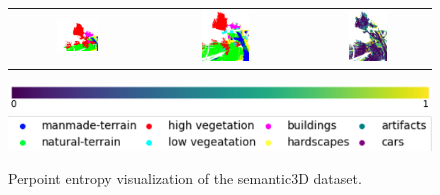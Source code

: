 \begin{figure}[h!]
\begin{tabular}{ccc}
            \includegraphics[width=0.33\textwidth, height=0.18\textheight]{images/seg_output/sem3d_seg_output/3_GT.pdf} &
            \includegraphics[width=0.33\textwidth, height=0.18\textheight]{images/seg_output/flipout/sem3d_3.pdf}& 
            \includegraphics[width=0.33\textwidth, height=0.18\textheight]{images/seg_output/sem3d_seg_output/ent_fout_3.pdf}\\
        \end{tabular}
        \includegraphics[scale=0.45]{images/prob_legend.pdf}
        \includegraphics[scale=0.65]{images/legend.png}
        \caption{Perpoint entropy visualization of the semantic3D dataset.}
        \label{fig:fout_sem3d_entmap}
    \end{figure}
